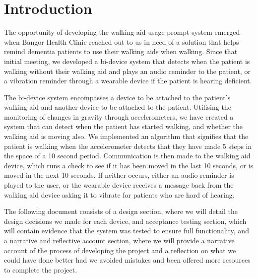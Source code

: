 \chapter{Introduction}

The opportunity of developing the walking aid usage prompt system emerged when Bangor Health Clinic reached out to us in need of a solution that helps remind dementia patients to use their walking aids when walking. Since that initial meeting, we developed a bi-device system that detects when the patient is walking without their walking aid and plays an audio reminder to the patient, or a vibration reminder through a wearable device if the patient is hearing deficient. 

The bi-device system encompasses a device to be attached to the patient's walking aid and another device to be attached to the patient. Utilising the monitoring of changes in gravity through accelerometers, we have created a system that can detect when the patient has started walking, and whether the walking aid is moving also. We implemented an algorithm that signifies that the patient is walking when the accelerometer detects that they have made 5 steps in the space of a 10 second period. Communication is then made to the walking aid device, which runs a check to see if it has been moved in the last 10 seconds, or is moved in the next 10 seconds. If neither occurs, either an audio reminder is played to the user, or the wearable device receives a message back from the walking aid device asking it to vibrate for patients who are hard of hearing. 

The following document consists of a design section, where we will detail the design decisions we made for each device, and acceptance testing section, which will contain evidence that the system was tested to ensure full functionality, and a narrative and reflective account section, where we will provide a narrative account of the process of developing the project and a reflection on what we could have done better had we avoided mistakes and been offered more resources to complete the project.